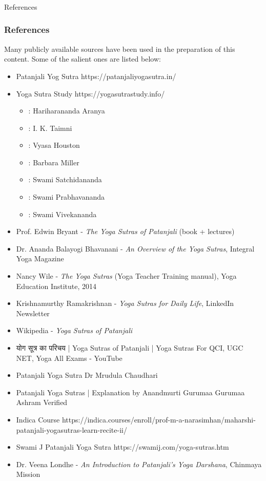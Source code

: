 \begin{frame}[fragile]\frametitle{}
\begin{center}
{\Large References}
\end{center}
\end{frame}


\begin{frame}[fragile]\frametitle{References}

Many publicly available sources have been used in the preparation of this content. Some of the salient ones are listed below:

	\begin{itemize}
	\item Patanjali Yog Sutra https://patanjaliyogasutra.in/
	\item Yoga Sutra Study https://yogasutrastudy.info/
		\begin{itemize}
		\item [HA]: Hariharananda Aranya
		\item [IT]: I. K. Taimni
		\item [VH]: Vyasa Houston
		\item [BM]: Barbara Miller
		\item [SS]: Swami Satchidananda
		\item [SP]: Swami Prabhavananda
		\item [SV]: Swami Vivekananda
		\end{itemize}
	\item Prof. Edwin Bryant - \emph{The Yoga Sutras of Patanjali} (book + lectures)
	\item Dr. Ananda Balayogi Bhavanani - \emph{An Overview of the Yoga Sutras}, Integral Yoga Magazine
	\item Nancy Wile - \emph{The Yoga Sutras} (Yoga Teacher Training manual), Yoga Education Institute, 2014
	\item Krishnamurthy Ramakrishnan - \emph{Yoga Sutras for Daily Life}, LinkedIn Newsletter
	\item Wikipedia - \emph{Yoga Sutras of Patanjali}
	\item योग सूत्र का परिचय | Yoga Sutras of Patanjali | Yoga Sutras For QCI, UGC NET, Yoga All Exams - YouTube
	\item Patanjali Yoga Sutra Dr Mrudula Chaudhari
	\item Patanjali Yoga Sutras | Explanation by Anandmurti Gurumaa Gurumaa Ashram Verified
	\item Indica Course https://indica.courses/enroll/prof-m-a-narasimhan/maharshi-patanjali-yogasutras-learn-recite-ii/
	\item Swami J Patanjali Yoga Sutra https://swamij.com/yoga-sutras.htm
	\item Dr. Veena Londhe - \emph{An Introduction to Patanjali's Yoga Darshana}, Chinmaya Mission
	\end{itemize}

\end{frame}

